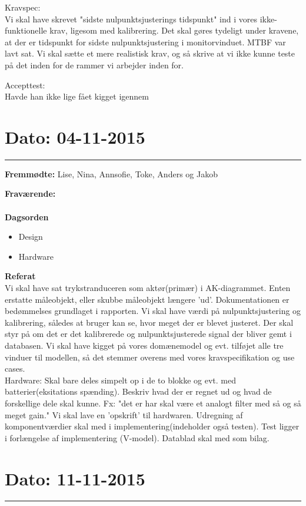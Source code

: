 Kravspec:
\\
Vi skal have skrevet "sidste nulpunktsjusterings tidspunkt" ind i vores ikke-funktionelle krav, ligesom med kalibrering. Det skal gøres tydeligt under kravene, at der er tidspunkt for sidste nulpunktsjustering i monitorvinduet.
MTBF var lavt sat. Vi skal sætte et mere realistisk krav, og så skrive at vi ikke kunne teste på det inden for de rammer vi arbejder inden for.

Accepttest:
\\
Havde han ikke lige fået kigget igennem


\section{Dato: 04-11-2015}
\hrule

\textbf{Fremmødte:} Lise, Nina, Annsofie, Toke, Anders og Jakob

\textbf{Fraværende:} 
\\
\\
\textbf{Dagsorden}
\begin{itemize}
	\item Design
	\item Hardware
\end{itemize}

\textbf{Referat}
\\
Vi skal have sat trykstranduceren som aktør(primær) i AK-diagrammet. Enten erstatte måleobjekt, eller skubbe måleobjekt længere 'ud'.
Dokumentationen er bedømmelses grundlaget i rapporten.
Vi skal have værdi på nulpunktsjustering og kalibrering, således at bruger kan se, hvor meget der er blevet justeret.
Der skal styr på om det er det kalibrerede og nulpunktsjusterede signal der bliver gemt i databasen.
Vi skal have kigget på vores domænemodel og evt. tilføjet alle tre vinduer til modellen, så det stemmer overens med vores kravspecifikation og use cases.
\\
Hardware:
Skal bare deles simpelt op i de to blokke og evt. med batterier(eksitations spænding).
Beskriv hvad der er regnet ud og hvad de forskellige dele skal kunne. 
Fx: "det er har skal være et analogt filter med så og så meget gain."
Vi skal lave en 'opskrift' til hardwaren.
Udregning af komponentværdier skal med i implementering(indeholder også testen).
Test ligger i forlængelse af implementering (V-model).
Datablad skal med som bilag.


\section{Dato: 11-11-2015}
\hrule

